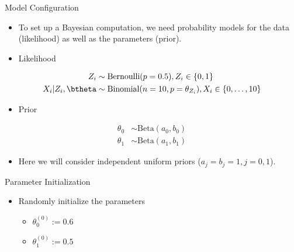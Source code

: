 \documentclass[dvipdfmx,bigger,aspectratio=169]{beamer}
\begin{document}
\begin{frame}[label={sec:org5d59c5a}]{Model Configuration}
\begin{itemize}
\item To set up a Bayesian computation, we need probability models for the data (likelihood) as well as the parameters (prior).
\item Likelihood
\end{itemize}
\begin{align*}
  Z_{i} &\sim \text{Bernoulli}(p = 0.5), Z_{i} \in \left\{ 0,1 \right\}\\
  X_{i} | Z_{i}, \btheta &\sim \text{Binomial}(n = 10, p = \theta_{Z_{i}}), X_{i} \in \left\{ 0, \dots, 10 \right\}
\end{align*}
\begin{itemize}
\item Prior
\end{itemize}
\begin{align*}
  \theta_{0} &\sim \text{Beta}(a_{0},b_{0})\\
  \theta_{1} &\sim \text{Beta}(a_{1},b_{1})
\end{align*}
\begin{itemize}
\item Here we will consider independent uniform priors (\(a_{j} = b_{j} = 1, j = 0,1\)).
\end{itemize}
\end{frame}

\begin{frame}[label={sec:org9c4b0ef}]{Parameter Initialization}
\begin{itemize}
\item Randomly initialize the parameters
\begin{itemize}
\item \(\theta_{0}^{(0)} := 0.6\)
\item \(\theta_{1}^{(0)} := 0.5\)
\end{itemize}
\end{itemize}
\end{frame}
\end{document}
